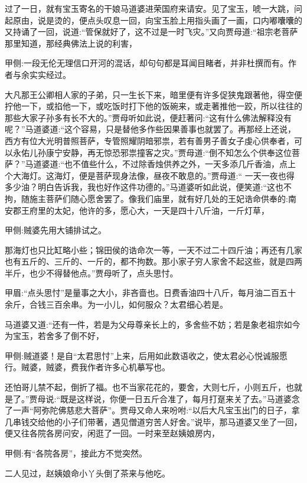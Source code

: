 \begin{parag}
    过了一日，就有宝玉寄名的干娘马道婆进荣国府来请安。见了宝玉，唬一大跳，问起原由，说是烫的，便点头叹息一回，向宝玉脸上用指头画了一画，口内嘟囔囔的又持诵了一回，说道:“管保就好了，这不过是一时飞灾。”又向贾母道:“祖宗老菩萨那里知道，那经典佛法上说的利害，\begin{note}甲侧:一段无伦无理信口开河的混话，却句句都是耳闻目睹者，并非杜撰而有。作者与余实实经过。\end{note}大凡那王公卿相人家的子弟，只一生长下来，暗里便有许多促狭鬼跟著他，得空便拧他一下，或掐他一下，或吃饭时打下他的饭碗来，或走著推他一跤，所以往往的那些大家子孙多有长不大的。”贾母听如此说，便赶著问:“这有什么佛法解释没有呢？”马道婆道:“这个容易，只是替他多作些因果善事也就罢了。再那经上还说，西方有位大光明普照菩萨，专管照耀阴暗邪祟，若有善男子善女子虔心供奉者，可以永佑儿孙康宁安静，再无惊恐邪祟撞客之灾。”贾母道:“倒不知怎么个供奉这位菩萨？”马道婆道:“也不值些什么，不过除香烛供养之外，一天多添几斤香油，点上个大海灯。这海灯，便是菩萨现身法像，昼夜不敢息的。”贾母道:“ 一天一夜也得多少油？明白告诉我，我也好作这件功德的。”马道婆听如此说，便笑道:“这也不拘，随施主菩萨们随心愿舍罢了。像我们庙里，就有好几处的王妃诰命供奉的:南安郡王府里的太妃，他许的多，愿心大，一天是四十八斤油，一斤灯草，\begin{note}甲侧:贼婆先用大铺排试之。\end{note}那海灯也只比缸略小些；锦田侯的诰命次一等，一天不过二十四斤油；再还有几家也有五斤的、三斤的、一斤的，都不拘数。那小家子穷人家舍不起这些，就是四两半斤，也少不得替他点。”贾母听了，点头思忖。\begin{note}甲眉:“点头思忖”是量事之大小，非吝啬也。日费香油四十八斤，每月油二百五十余斤，合钱三百余串。为一小儿，如何服众？太君细心若是。\end{note}马道婆又道:“还有一件，若是为父母尊亲长上的，多舍些不妨；若是象老祖宗如今为宝玉，若舍多了倒不好，\begin{note}甲侧:贼道婆！是自“太君思忖”上来，后用如此数语收之，使太君必心悦诚服愿行。贼婆，贼婆，费我作者许多心机摹写也。\end{note}还怕哥儿禁不起，倒折了福。也不当家花花的，要舍，大则七斤，小则五斤，也就是了。”贾母说:“既是这样说，你便一日五斤合准了，每月打趸来关了去。”马道婆念了一声“阿弥陀佛慈悲大菩萨”。贾母又命人来吩咐:“以后大凡宝玉出门的日子，拿几串钱交给他的小子们带著，遇见僧道穷苦人好舍。”说毕，那马道婆又坐了一回，便又往各院各房问安，闲逛了一回。一时来至赵姨娘房内，\begin{note}甲侧:有“各院各房”，接此方不觉突然。\end{note}二人见过，赵姨娘命小丫头倒了茶来与他吃。
\end{parag}


